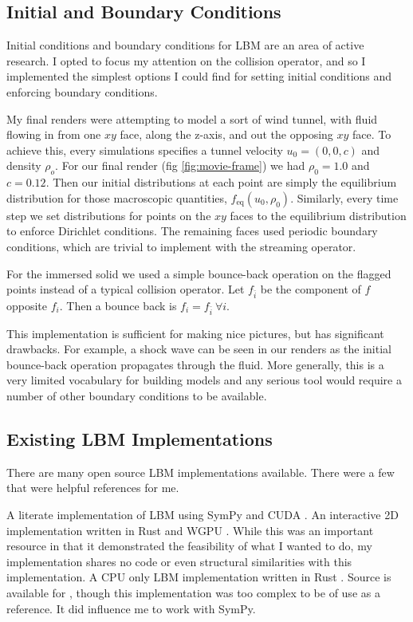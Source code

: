 \subsection{Initial and Boundary Conditions}\label{sec:ic-and-bc}

Initial conditions and boundary conditions for LBM
are an area of active research.
I opted to focus my attention on the collision operator,
and so I implemented the simplest options I could find 
for setting initial conditions and enforcing boundary conditions.

My final renders were attempting to model a sort of wind tunnel,
with fluid flowing in from one $xy$ face, along the z-axis, 
and out the opposing $xy$ face.
To achieve this, every simulations specifies a tunnel velocity 
$u_0 = (0, 0, c)$ and density $\rho_o$.
For our final render (fig \ref{fig:movie-frame})
we had $\rho_0 = 1.0$ and $c = 0.12$.
Then our initial distributions at each point are simply 
the equilibrium distribution for those macroscopic quantities,
$f_{\text{eq}}(u_0, \rho_0)$.
Similarly, every time step we set distributions for points on the
$xy$ faces to the equilibrium distribution 
to enforce Dirichlet conditions.
The remaining faces used periodic boundary conditions, which
are trivial to implement with the streaming operator.

For the immersed solid we used a simple bounce-back 
operation \cite{Kruger2018} on the flagged points
instead of a typical collision operator.
Let $f_{\bar{i}}$ be the component of $f$ opposite $f_i$.
Then a bounce back is $f_i = f_{\bar{i}} \ \forall i$.

This implementation is sufficient for making nice pictures, 
but has significant drawbacks.
For example, a shock wave can be seen in our renders
as the initial bounce-back operation propagates through the fluid.
More generally, this is a very limited vocabulary for building
models and any serious tool would require a number of
other boundary conditions to be available.

\subsection{Existing LBM Implementations}

There are many open source LBM implementations available.
There were a few that were helpful references for me.
\begin{outline}
  \1 A literate implementation of LBM using SymPy and CUDA \cite{web:literate_lbm}.
  \1 An interactive 2D implementation written in Rust and WGPU \cite{web:lbm-web}.
  \2 While this was an important resource in that it demonstrated 
  the feasibility of what I wanted to do, 
  my implementation shares no code or even structural similarities 
  with this implementation.
  \1 A CPU only LBM implementation written in Rust \cite{web:lbm-rs}.
  \1 Source is available for \cite{Hennig2023}, though this implementation was too complex to be of use as a reference. 
  It did influence me to work with SymPy.
\end{outline}
